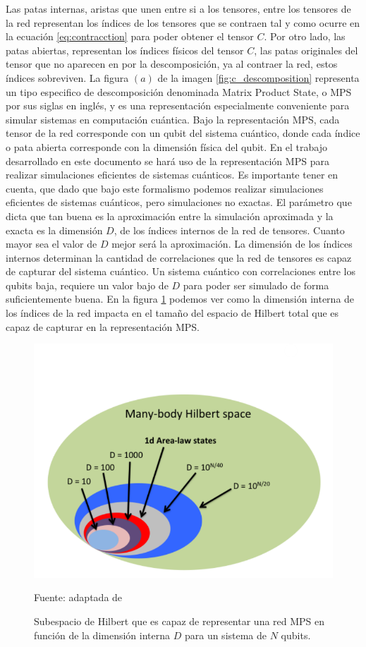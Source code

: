 Las patas internas, aristas que unen entre si a los tensores, entre los tensores de la red representan los índices de los tensores que se contraen tal y como ocurre en la ecuación \ref{eq:contracction} para poder obtener el tensor $C$. Por otro lado, las patas abiertas, representan los índices físicos del tensor $C$, las patas originales del tensor que no aparecen en por la descomposición, ya al contraer la red, estos índices sobreviven. La figura $(a)$ de la imagen \ref{fig:c_descomposition} representa un tipo especifico de descomposición denominada Matrix Product State, o MPS por sus siglas en inglés, y es una representación especialmente conveniente para simular sistemas en computación cuántica. Bajo la representación MPS, cada tensor de la red corresponde con un qubit del sistema cuántico, donde cada índice o pata abierta corresponde con la dimensión física del qubit. En el trabajo desarrollado en este documento se hará uso de la representación MPS para realizar simulaciones eficientes de sistemas cuánticos. Es importante tener en cuenta, que dado que bajo este formalismo podemos realizar simulaciones eficientes de sistemas cuánticos, pero simulaciones no exactas. El parámetro que dicta que tan buena es la aproximación entre la simulación aproximada y la exacta es la dimensión $D$, de los índices internos de la red de tensores. Cuanto mayor sea el valor de $D$ mejor será la aproximación. La dimensión de los índices internos determinan la cantidad de correlaciones que la red de tensores es capaz de capturar del sistema cuántico. Un sistema cuántico con correlaciones entre los qubits baja, requiere un valor bajo de $D$ para poder ser simulado de forma suficientemente buena. En la figura \ref{fig:mps_hilbert_space} podemos ver como la dimensión interna de los índices de la red impacta en el tamaño del espacio de Hilbert total que es capaz de capturar en la representación MPS.


\begin{figure}[!ht]
    \centering
    \includegraphics[scale = 0.55]{img/03-mps_espacio_hilbert.png}
    \caption{Subespacio de Hilbert que es capaz de representar una red MPS en función de la dimensión interna $D$ para un sistema de $N$ qubits.}
    Fuente: adaptada de \citep{orus} 
    \label{fig:mps_hilbert_space}
\end{figure}

